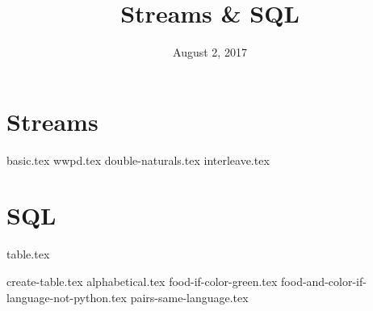 \documentclass{exam}
\title{Streams \& SQL}
\date{August 2, 2017}
\begin{document}
\maketitle

\section{Streams}
\begin{questions}
{basic.tex}
{wwpd.tex}
{double-naturals.tex}
{interleave.tex}
\end{questions}

\lstset{language=SQL}
\section{SQL}
{table.tex}
\begin{questions}
{create-table.tex}
{alphabetical.tex}
{food-if-color-green.tex}
{food-and-color-if-language-not-python.tex}
{pairs-same-language.tex}
\end{questions}
\end{document}
